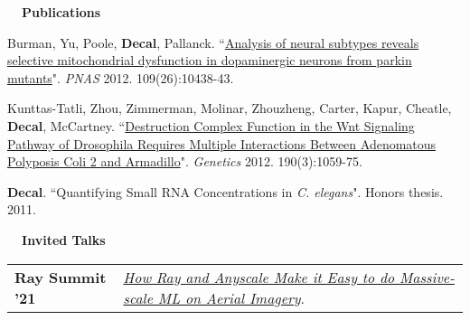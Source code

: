 \documentclass[a4paper,12pt]{article}
\newcommand{\resheading}[1]{{\vspace*{.001in} \colorbox{mygrey}{\begin{minipage}{\textwidth}{\textmd{\large \textbf{#1} \vphantom{p\^{E}}}}\end{minipage}}} }
\begin{document}
%
%

\resheading{~~Publications}
\vspace{-1em}
{\setlength{\parskip}{8pt}

      Burman, Yu, Poole, \textbf{Decal}, Pallanck. ``\href{http://www.pnas.org/content/early/2012/06/12/1120688109}{Analysis of neural subtypes reveals selective mitochondrial dysfunction in dopaminergic neurons from parkin mutants}". \textit{PNAS} 2012. 109(26):10438-43.
      
      Kunttas-Tatli, Zhou, Zimmerman, Molinar, Zhouzheng, Carter, Kapur, Cheatle, \textbf{Decal}, McCartney. ``\href{http://www.genetics.org/content/190/3/1059.full}{Destruction Complex Function in the Wnt Signaling Pathway of Drosophila Requires Multiple Interactions Between Adenomatous Polyposis Coli 2 and Armadillo}". \textit{Genetics} 2012. 190(3):1059-75.
      
      \textbf{\textbf{Decal}}. ``Quantifying Small RNA Concentrations in \textit{C. elegans}". Honors thesis. 2011.\\
      
}

      \resheading{~~Invited Talks}
      \vspace{-1.5em}
      
      \begin{tabularx}{\textwidth}{p{3cm}>{\arraybackslash}X}  %
      
       \bfseries{Ray Summit '21} &  \href{https://raysummit.anyscale.com/content/Videos/dJRSr3NJLSP4h9CT8}{\textit{How Ray and Anyscale Make it Easy to do Massive-scale ML on Aerial Imagery}}.\\
      \end{tabularx}
      
\end{document}
